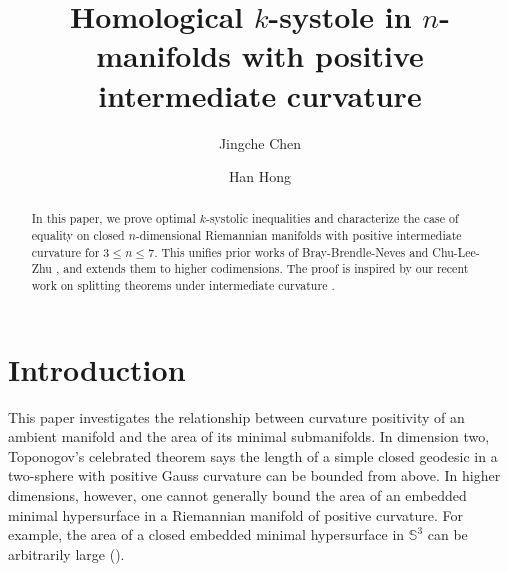 \documentclass[11pt]{amsart}
\theoremstyle{definition}
\theoremstyle{remark}
\numberwithin{equation}{section}
\begin{document}
\title[Homological $k$-systole in $n$-manifolds]{Homological $k$-systole in $n$-manifolds with
  positive intermediate curvature}

\author{Jingche Chen}
\address{Department of Mathematical Sciences, Tsinghua University, 100084, Beijing, China}



\author{Han Hong}
\address{Department of Mathematics and statistics \\ Beijing Jiaotong University \\ Beijing \\
  China, 100044}




\begin{abstract}
In this paper, we prove optimal $k$-systolic inequalities and characterize the case of equality on
  closed $n$-dimensional Riemannian manifolds with positive intermediate curvature for $3\leq n\leq
  7$.  This unifies prior works of Bray-Brendle-Neves \cite{BrayBrenleNevesrigidity} and
  Chu-Lee-Zhu \cite{chuleezhu_n_systole}, and extends them to higher codimensions. The proof is
  inspired by our recent work on splitting theorems under intermediate curvature
  \cite{chenhong2026}. 
\end{abstract}

\maketitle

\section{Introduction}
This paper investigates the relationship between curvature positivity of an ambient manifold and
  the area of its minimal submanifolds. In dimension two, Toponogov's celebrated theorem
  \cite{toponogov_closed_geodesic} says the length of a simple closed geodesic in a two-sphere with
  positive Gauss curvature can be bounded from above. In higher dimensions, however, one cannot generally bound the area of an
  embedded minimal hypersurface in a Riemannian manifold of positive curvature. For example, the
  area of a closed embedded minimal hypersurface in $\mathbb{S}^{3}$ can be arbitrarily large
  (\cite{zhou_multiplicity_one_conj}).  
\end{document}
